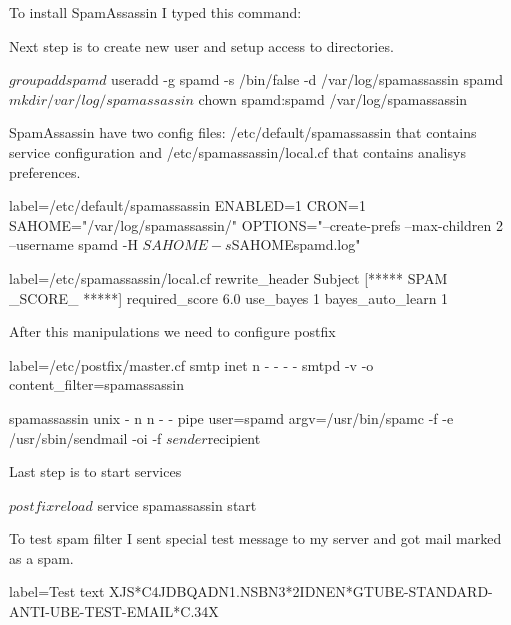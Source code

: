 \documentclass[a4paper,11pt]{article}
\begin{document}
To install SpamAssassin I typed this command:

Next step is to create new user and setup access to directories.
\begin{bashcode}
$ groupadd spamd
$ useradd -g spamd -s /bin/false -d /var/log/spamassassin spamd
$ mkdir /var/log/spamassassin
$ chown spamd:spamd /var/log/spamassassin
\end{bashcode}
SpamAssassin have two config files: /etc/default/spamassassin that contains service configuration and /etc/spamassassin/local.cf that contains analisys preferences.
\begin{bashcode*}{label=/etc/default/spamassassin}
ENABLED=1
CRON=1
SAHOME="/var/log/spamassassin/"
OPTIONS="--create-prefs --max-children 2 --username spamd -H ${SAHOME} -s ${SAHOME}spamd.log"
\end{bashcode*}

\begin{bashcode*}{label=/etc/spamassassin/local.cf}
rewrite_header Subject [***** SPAM _SCORE_ *****]
required_score 6.0
use_bayes 1
bayes_auto_learn 1
\end{bashcode*}

After this manipulations we need to configure postfix 
\begin{bashcode*}{label=/etc/postfix/master.cf}
smtp      inet  n       -       -       -       -       smtpd -v -o content_filter=spamassassin

spamassassin unix -     n       n       -       -       pipe
 user=spamd argv=/usr/bin/spamc -f -e
 /usr/sbin/sendmail -oi -f ${sender} ${recipient}
\end{bashcode*}

Last step is to start services
\begin{bashcode}
$ postfix reload
$ service spamassassin start
\end{bashcode}

To test spam filter I sent special test message to my server and got mail marked as a spam.

\begin{bashcode*}{label=Test text}
XJS*C4JDBQADN1.NSBN3*2IDNEN*GTUBE-STANDARD-ANTI-UBE-TEST-EMAIL*C.34X
\end{bashcode*}
\end{document}
